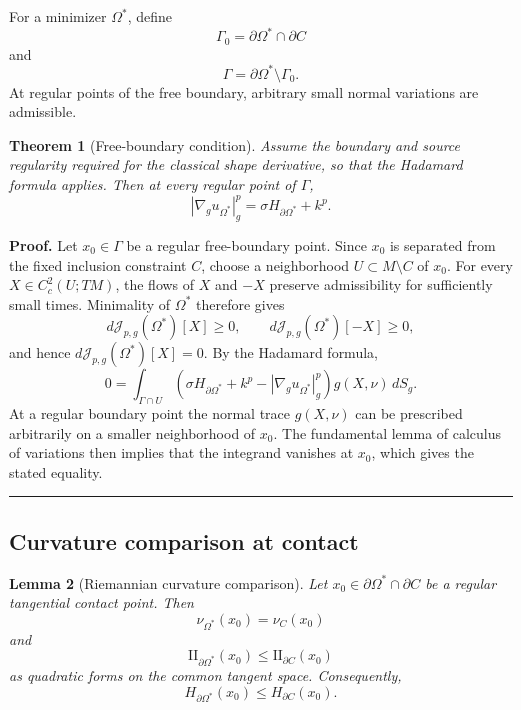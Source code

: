 \documentclass{article}
\renewcommand{\boxed}[1]{#1}
\newtheorem{theorem}{Theorem}[section]
\newtheorem{lemma}[theorem]{Lemma}
\newenvironment{proof}[1][Proof]{\textbf{#1.} }{\hfill\rule{0.5em}{0.5em}}
\begin{document}
For a minimizer $\Omega^\ast$, define
\[
\Gamma_0=\partial\Omega^\ast\cap\partial C
\]
and
\[
\Gamma=\partial\Omega^\ast\setminus\Gamma_0.
\]
At regular points of the free boundary, arbitrary small normal
variations are admissible.

\begin{theorem}[Free-boundary condition]
\label{thm:free-boundary-condition}
Assume the boundary and source regularity required for the classical
shape derivative, so that the Hadamard formula applies. Then at every
regular point of $\Gamma$,
\[
\boxed{
|\nabla_g u_{\Omega^\ast}|_g^p
=
\sigma H_{\partial\Omega^\ast}+k^p.
}
\]
\end{theorem}

\begin{proof}
Let $x_0\in\Gamma$ be a regular free-boundary point. Since $x_0$ is
separated from the fixed inclusion constraint $C$, choose a neighborhood
$U\subset M\setminus C$ of $x_0$. For every $X\in C_c^2(U;TM)$, the flows
of $X$ and $-X$ preserve admissibility for sufficiently small times.
Minimality of $\Omega^*$ therefore gives
\[
d\mathcal J_{p,g}(\Omega^*)[X]\ge0,
\qquad
d\mathcal J_{p,g}(\Omega^*)[-X]\ge0,
\]
and hence $d\mathcal J_{p,g}(\Omega^*)[X]=0$. By the Hadamard formula,
\[
0=\int_{\Gamma\cap U}
\left(\sigma H_{\partial\Omega^*}+k^p-
|\nabla_g u_{\Omega^*}|_g^p\right)g(X,\nu)\,dS_g.
\]
At a regular boundary point the normal trace $g(X,\nu)$ can be prescribed
arbitrarily on a smaller neighborhood of $x_0$. The fundamental lemma of
calculus of variations then implies that the integrand vanishes at $x_0$,
which gives the stated equality.
\end{proof}

\subsection{Curvature comparison at contact}

\begin{lemma}[Riemannian curvature comparison]
\label{lem:curvature-comparison}
Let $x_0\in\partial\Omega^*\cap\partial C$ be a regular tangential
contact point. Then
\[
\nu_{\Omega^*}(x_0)=\nu_C(x_0)
\]
and
\[
\mathrm{II}_{\partial\Omega^*}(x_0)
\leq
\mathrm{II}_{\partial C}(x_0)
\]
as quadratic forms on the common tangent space. Consequently,
\[
H_{\partial\Omega^*}(x_0)
\leq
H_{\partial C}(x_0).
\]
\end{lemma}
\end{document}
